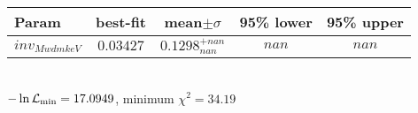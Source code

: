 \begin{tabular}{|l|c|c|c|c|} 
 \hline 
Param & best-fit & mean$\pm\sigma$ & 95\% lower & 95\% upper \\ \hline 
$inv_{M wdm keV }$ &$0.03427$ & $0.1298_{nan}^{+nan}$ & $nan$ & $nan$ \\ 
\hline 
 \end{tabular} \\ 
$-\ln{\cal L}_\mathrm{min} =17.0949$, minimum $\chi^2=34.19$ \\ 
